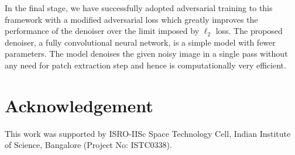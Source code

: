 \documentclass[10pt,twocolumn,letterpaper]{proc}
\begin{document}
In the final stage, we have successfully adopted adversarial training to this framework with a modified adversarial loss which greatly improves the performance of the denoiser over the limit imposed by $\ell_2$ loss.
The proposed denoiser, a fully convolutional neural network, is a simple model with fewer parameters. 
The model denoises the given noisy image in a single pass without any need for patch extraction step and hence is computationally very efficient.

\section{Acknowledgement}
This work was supported by ISRO-IISc Space Technology Cell, Indian Institute of Science, Bangalore (Project No: ISTC0338).
{%


}

\end{document}

